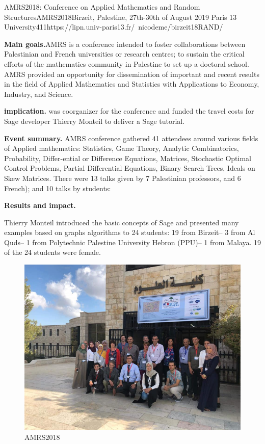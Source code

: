 \begin{event}{AMRS2018: Conference on Applied Mathematics and Random Structures}{AMRS2018}{Birzeit, Palestine, 27th-30th of August 2019}
{Paris 13 University}{41}{1}{https://lipn.univ-paris13.fr/~nicodeme/birzeit18RAND/}

\textbf{Main goals.}AMRS is a conference intended to foster collaborations between Palestinian and French universities or research centres; 
to sustain the critical efforts of the mathematics community in Palestine to set up a doctoral school. AMRS provided an opportunity for dissemination of important and recent results in the field of Applied Mathematics and Statistics with Applications to Economy, Industry, and Science.

\textbf{\ODK implication.}
\ODK was coorganizer for the conference and funded the travel costs
for Sage developer Thierry Monteil to deliver a Sage tutorial.

\textbf{Event summary.}
AMRS conference gathered 41 attendees around various fields of Applied mathematics: Statistics, Game Theory, Analytic Combinatorics, 
Probability, Differ-ential or Difference Equations, Matrices,
Stochastic Optimal Control Problems, Partial Differential Equations, 
Binary Search Trees, Ideals on Skew Matrices. 
There were 13 talks given by 7 Palestinian professors, and 6 French); and 10 talks by students:

\textbf{Results and impact.}

Thierry Monteil introduced the basic concepts of Sage and presented
many examples based on graphs algorithms to 24 students: 19 from
Birzeit– 3 from Al Quds– 1 from Polytechnic Palestine University
Hebron (PPU)– 1 from Malaya. 19 of the 24 students were female.


\begin{figure}[ht]
  \includegraphics[width=.75\textwidth]{AMRS.png}
  \caption*{AMRS2018}
\end{figure}

\end{event}
